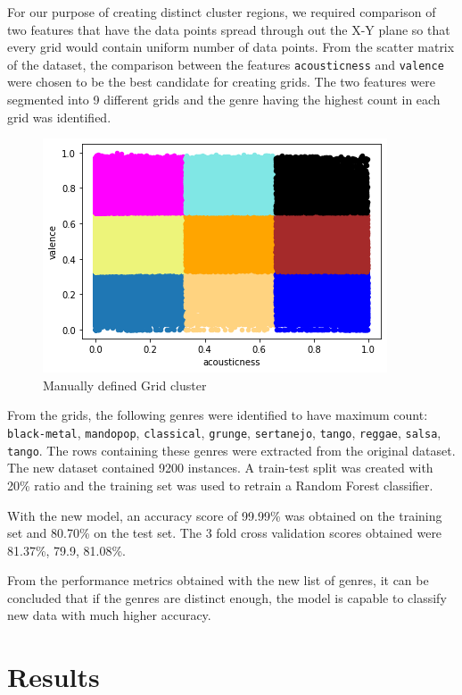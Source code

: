 \documentclass[conference]{IEEEtran}
\begin{document}
For our purpose of creating distinct cluster regions, we required comparison of two features that have the data points spread through out the X-Y plane so that every grid would contain uniform number of data points. From the scatter matrix of the dataset, the comparison between the features \texttt{acousticness} and \texttt{valence} were chosen to be the best candidate for creating grids. The two features were segmented into 9 different grids and the genre having the highest count in each grid was identified.

\begin{figure}[htbp]
\centering
\includegraphics[width=.9\linewidth]{./images/grid_cluster.png}
\caption{Manually defined Grid cluster}
\end{figure}

 From the grids, the following genres were identified to have maximum count: \texttt{black-metal}, \texttt{mandopop},
\texttt{classical}, \texttt{grunge}, \texttt{sertanejo}, \texttt{tango}, \texttt{reggae}, \texttt{salsa}, \texttt{tango}. The rows containing these genres were extracted from the original dataset. The new dataset contained 9200 instances. A train-test split was created with 20\% ratio and the training set was used to retrain a Random Forest classifier.

With the new model, an accuracy score of 99.99\% was obtained on the training set and 80.70\% on the test set. The 3 fold cross validation scores obtained were 81.37\%, 79.9, 81.08\%.

From the performance metrics obtained with the new list of genres, it can be concluded that if the genres are distinct enough, the model is capable to classify new data with much higher accuracy.

\section{Results}
\label{sec:org68c7fdd}
\end{document}
